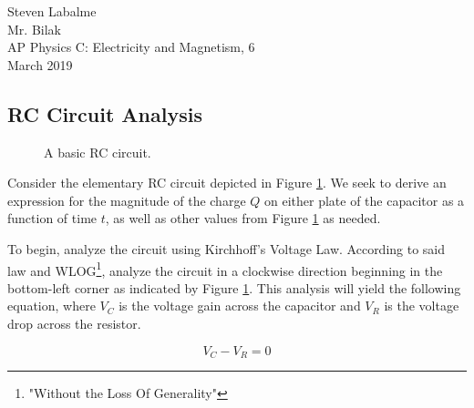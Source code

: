 \documentclass{article}
\begin{document}
\noindent Steven Labalme\\
\noindent Mr. Bilak\\
\noindent AP Physics C: Electricity and Magnetism, 6\\
 March 2019\\

\begin{center}
    \section*{RC Circuit Analysis}
\end{center}

\begin{figure}[h!]
    \centering
    \caption{A basic RC circuit.}
    \label{fig:RC}
\end{figure}

Consider the elementary RC circuit depicted in Figure \ref{fig:RC}. We seek to derive an expression for the magnitude of the charge $Q$ on either plate of the capacitor as a function of time $t$, as well as other values from Figure \ref{fig:RC} as needed.\par
To begin, analyze the circuit using Kirchhoff's Voltage Law. According to said law and WLOG\footnote{"Without the Loss Of Generality"}, analyze the circuit in a clockwise direction beginning in the bottom-left corner as indicated by Figure \ref{fig:RC}. This analysis will yield the following equation, where $V_C$ is the voltage gain across the capacitor and $V_R$ is the voltage drop across the resistor.

\begin{equation*}
    V_C-V_R=0
\end{equation*}
\end{document}
